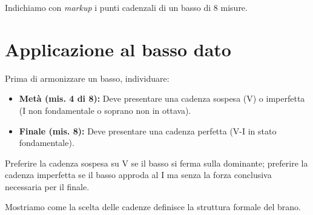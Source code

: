 \begin{esempio}
    Indichiamo con \textit{markup} i punti cadenzali di un basso di 8 misure.
\end{esempio}

\section{Applicazione al basso dato}
\label{sec:applicazione_frase}

\begin{regola}
    Prima di armonizzare un basso, individuare:
    \begin{itemize}
        \item \textbf{Metà (mis. 4 di 8):} Deve presentare una cadenza sospesa (V) o imperfetta (I non fondamentale o soprano non in ottava).
        \item \textbf{Finale (mis. 8):} Deve presentare una cadenza perfetta (V-I in stato fondamentale).
    \end{itemize}
\end{regola}

\begin{regola}
    Preferire la cadenza sospesa su V se il basso si ferma sulla dominante; preferire la cadenza imperfetta se il basso approda al I ma senza la forza conclusiva necessaria per il finale.
\end{regola}

\begin{esempio}
    Mostriamo come la scelta delle cadenze definisce la struttura formale del brano.
\end{esempio}
